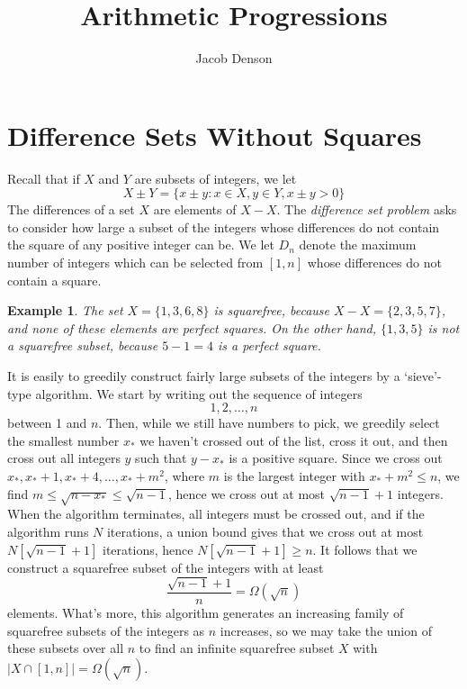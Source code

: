 \documentclass{article}
\title{Arithmetic Progressions}
\author{Jacob Denson}
\theoremstyle{plain}
\newtheorem*{example}{Example}
\theoremstyle{plain}
\begin{document}
\maketitle

\section{Difference Sets Without Squares}

Recall that if $X$ and $Y$ are subsets of integers, we let
%
\[ X \pm Y = \{ x \pm y: x \in X, y \in Y, x \pm y > 0 \} \]
%
The differences of a set $X$ are elements of $X - X$. The {\it difference set problem} asks to consider how large a subset of the integers whose differences do not contain the square of any positive integer can be. We let $D_n$ denote the maximum number of integers which can be selected from $[1,n]$ whose differences do not contain a square.

\begin{example}
    The set $X = \{ 1, 3, 6, 8 \}$ is squarefree, because $X - X = \{ 2, 3, 5, 7 \}$, and none of these elements are perfect squares. On the other hand, $\{ 1, 3, 5 \}$ is not a squarefree subset, because $5 - 1 = 4$ is a perfect square.
\end{example}

It is easily to greedily construct fairly large subsets of the integers by a `sieve'-type algorithm. We start by writing out the sequence of integers
%
\[ 1, 2, \dots, n \]
%
between 1 and $n$. Then, while we still have numbers to pick, we greedily select the smallest number $x_*$ we haven't crossed out of the list, cross it out, and then cross out all integers $y$ such that $y - x_*$ is a positive square. Since we cross out $x_*, x_* + 1, x_* + 4, \dots, x_* + m^2$, where $m$ is the largest integer with $x_* + m^2 \leq n$, we find $m \leq \sqrt{n - x_*} \leq \sqrt{n-1}$, hence we cross out at most $\sqrt{n-1} + 1$ integers. When the algorithm terminates, all integers must be crossed out, and if the algorithm runs $N$ iterations, a union bound gives that we cross out at most $N[\sqrt{n-1} + 1]$ iterations, hence $N[\sqrt{n-1} + 1] \geq n$. It follows that we construct a squarefree subset of the integers with at least
%
\[ \frac{\sqrt{n-1} + 1}{n} = \Omega(\sqrt{n}) \]
%
elements. What's more, this algorithm generates an increasing family of squarefree subsets of the integers as $n$ increases, so we may take the union of these subsets over all $n$ to find an infinite squarefree subset $X$ with $|X \cap [1,n]| = \Omega(\sqrt{n})$.
\end{document}

